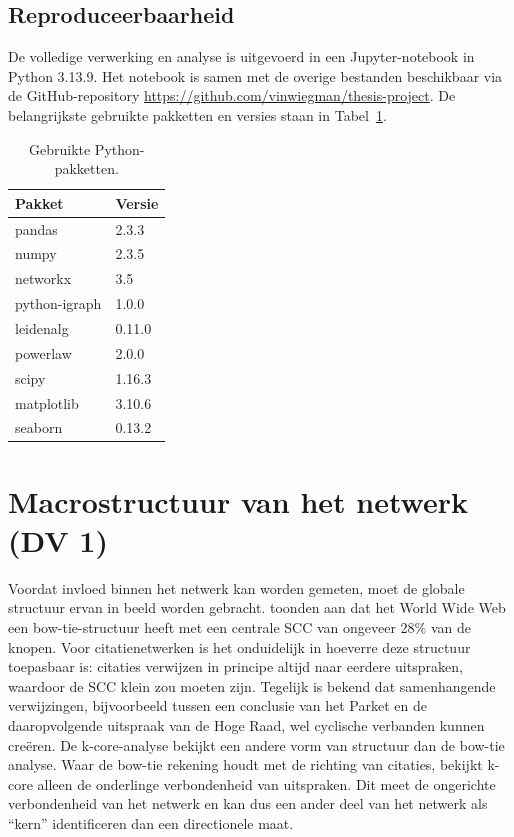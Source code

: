 \documentclass[a4paper, 12pt]{report}
\begin{document}
\section{Reproduceerbaarheid}

De volledige verwerking en analyse is uitgevoerd in een Jupyter-notebook in Python 3.13.9. Het notebook is samen met de overige bestanden beschikbaar via de GitHub-repository \url{https://github.com/vinwiegman/thesis-project}. De belangrijkste gebruikte pakketten en versies staan in Tabel~\ref{tab:packages}.

\begin{table}[H]
  \centering
  \caption{Gebruikte Python-pakketten.}
  \label{tab:packages}
  \begin{tabular}{ll}
    \toprule
    Pakket & Versie \\
    \midrule
    pandas              & 2.3.3 \\
    numpy               & 2.3.5 \\
    networkx            & 3.5 \\
    python-igraph       & 1.0.0 \\
    leidenalg           & 0.11.0 \\
    powerlaw            & 2.0.0 \\
    scipy               & 1.16.3 \\
    matplotlib          & 3.10.6 \\
    seaborn             & 0.13.2 \\
    \bottomrule
  \end{tabular}
\end{table}




\chapter{Macrostructuur van het netwerk (DV 1)}
\label{ch:dv1}

Voordat invloed binnen het netwerk kan worden gemeten, moet de globale structuur ervan in beeld worden gebracht. \textcite{broder2000} toonden aan dat het World Wide Web een bow-tie-structuur heeft met een centrale SCC van ongeveer 28\% van de knopen. Voor citatienetwerken is het onduidelijk in hoeverre deze structuur toepasbaar is: citaties verwijzen in principe altijd naar eerdere uitspraken, waardoor de SCC klein zou moeten zijn. Tegelijk is bekend dat samenhangende verwijzingen, bijvoorbeeld tussen een conclusie van het Parket en de daaropvolgende uitspraak van de Hoge Raad, wel cyclische verbanden kunnen creëren. De k-core-analyse \parencite{seidman1983, carmi2007} bekijkt een andere vorm van structuur dan de bow-tie analyse. Waar de bow-tie rekening houdt met de richting van citaties, bekijkt k-core alleen de onderlinge verbondenheid van uitspraken. Dit meet de ongerichte verbondenheid van het netwerk en kan dus een ander deel van het netwerk als ``kern'' identificeren dan een directionele maat.
\end{document}
